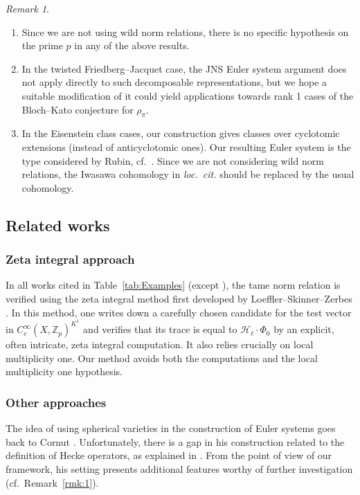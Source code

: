 \documentclass{amsart}
\theoremstyle{definition}
\theoremstyle{remark}
\newtheorem{remark}[theorem]{Remark}
\newcommand{\1}{\mathbf{1}}
\newcommand{\sh}[1]{\mathcal{#1}}
\newcommand{\Z}{\mathbb{Z}}
\theoremstyle{definition}
\begin{document}
\begin{remark}
    \begin{enumerate}
        \item Since we are not using wild norm relations, there is no specific hypothesis on the prime $p$ in any of the above results.
        \item In the twisted Friedberg--Jacquet case, the JNS Euler system argument does not apply directly to such decomposable representations, but we hope a suitable modification of it could yield applications towards rank 1 cases of the Bloch--Kato conjecture for $\rho_\pi$.
        \item In the Eisenstein class cases, our construction gives classes over cyclotomic extensions (instead of anticyclotomic ones). Our resulting Euler system is the type considered by Rubin, cf.~\cite[Definition 10.6.1]{LSZ}. Since we are not considering wild norm relations, the Iwasawa cohomology in \emph{loc.~cit.} should be replaced by the usual cohomology.
    \end{enumerate}
\end{remark}


\subsection{Related works}
\subsubsection{Zeta integral approach}
In all works cited in Table~\ref{tab:Examples} (except \cite{LLZ}), the tame norm relation is verified using the zeta integral method first developed by Loeffler--Skinner--Zerbes \cite{LSZ}. In this method, one writes down a carefully chosen candidate for the test vector in $C_c^\infty(X,\Z_p)^{K^1}$ and verifies that its trace is equal to $\sh{H}_\ell\cdot\Phi_0$ by an explicit, often intricate, zeta integral computation. It also relies crucially on local multiplicity one. Our method avoids both the computations and the local multiplicity one hypothesis.

\subsubsection{Other approaches}
The idea of using spherical varieties in the construction of Euler systems goes back to Cornut \cite{CornutES}. Unfortunately, there is a gap in his construction related to the definition of Hecke operators, as explained in \cite{ShahHeckeDescent}. From the point of view of our framework, his setting presents additional features worthy of further investigation (cf.~Remark~\ref{rmk:1}).
\end{document}
